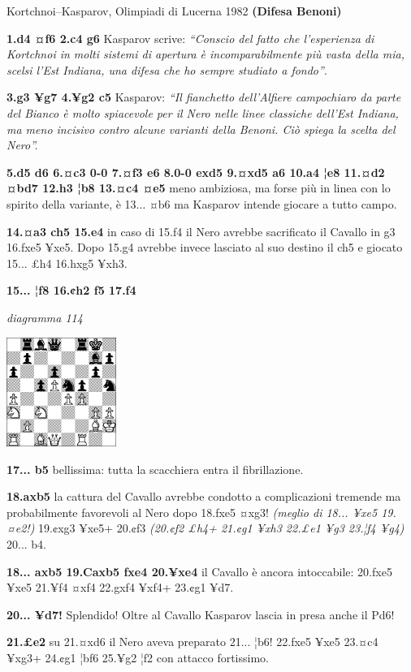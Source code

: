 \documentclass[
]{article}
\begin{document}
Kortchnoi--Kasparov, Olimpiadi di Lucerna 1982 \textbf{(Difesa Benoni)}

\textbf{1.d4 ¤f6 2.c4 g6} Kasparov scrive: \emph{``Conscio del fatto che
l'esperienza di Kortchnoi in molti sistemi di apertura è
incomparabilmente più vasta della mia, scelsi l'Est Indiana, una difesa
che ho sempre studiato a fondo''}.

\textbf{3.g3 ¥g7 4.¥g2 c5} Kasparov: \emph{``Il fianchetto dell'Alfiere
campochiaro da parte del Bianco è molto spiacevole per il Nero nelle
linee classiche dell'Est Indiana, ma meno incisivo contro alcune
varianti della Benoni. Ciò spiega la scelta del Nero''.}

\textbf{5.d5 d6 6.¤c3 0-0 7.¤f3 e6 8.0-0 exd5 9.¤xd5 a6 10.a4 ¦e8 11.¤d2
¤bd7 12.h3 ¦b8 13.¤c4 ¤e5} meno ambiziosa, ma forse più in linea con lo
spirito della variante, è 13... ¤b6 ma Kasparov intende giocare a tutto
campo.

\textbf{14.¤a3 ch5 15.e4} in caso di 15.f4 il Nero avrebbe sacrificato
il Cavallo in g3 16.fxe5 ¥xe5. Dopo 15.g4 avrebbe invece lasciato al suo
destino il ch5 e giocato 15... £h4 16.hxg5 ¥xh3.

\textbf{15... ¦f8 16.¢h2 f5 17.f4}

\emph{diagramma 114}

\includegraphics[width=1.40139in,height=1.40139in]{vertopal_109f12be458a423d8f3cc838880eaea2/media/image114.png}

\textbf{17... b5} bellissima: tutta la scacchiera entra il
fibrillazione.

\textbf{18.axb5} la cattura del Cavallo avrebbe condotto a complicazioni
tremende ma probabilmente favorevoli al Nero dopo 18.fxe5 ¤xg3!
\emph{(meglio di 18... ¥xe5 19.¤e2!)} 19.¢xg3 ¥xe5+ 20.¢f3 \emph{(20.¢f2
£h4+ 21.¢g1 ¥xh3 22.£e1 ¥g3 23.¦f4 ¥g4)} 20... b4.

\textbf{18... axb5 19.Caxb5 fxe4 20.¥xe4} il Cavallo è ancora
intoccabile: 20.fxe5 ¥xe5 21.¥f4 ¤xf4 22.gxf4 ¥xf4+ 23.¢g1 ¥d7.

\textbf{20... ¥d7!} Splendido! Oltre al Cavallo Kasparov lascia in presa
anche il Pd6!

\textbf{21.£e2} su 21.¤xd6 il Nero aveva preparato 21... ¦b6! 22.fxe5
¥xe5 23.¤c4 ¥xg3+ 24.¢g1 ¦bf6 25.¥g2 ¦f2 con attacco fortissimo.
\end{document}
